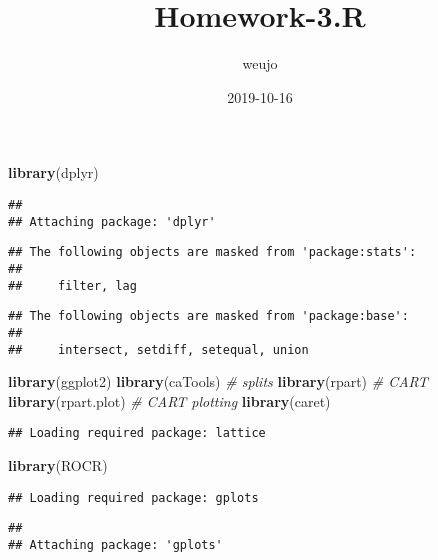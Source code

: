 \documentclass[]{article}
\title{Homework-3.R}
\author{weujo}
\date{2019-10-16}
\newenvironment{Shaded}{\begin{snugshade}}{\end{snugshade}}
\newcommand{\CommentTok}[1]{\textcolor[rgb]{0.56,0.35,0.01}{\textit{#1}}}
\newcommand{\KeywordTok}[1]{\textcolor[rgb]{0.13,0.29,0.53}{\textbf{#1}}}
\newcommand{\NormalTok}[1]{#1}
\begin{document}
\maketitle

\begin{Shaded}
\begin{Highlighting}[]
\KeywordTok{library}\NormalTok{(dplyr)}
\end{Highlighting}
\end{Shaded}

\begin{verbatim}
## 
## Attaching package: 'dplyr'
\end{verbatim}

\begin{verbatim}
## The following objects are masked from 'package:stats':
## 
##     filter, lag
\end{verbatim}

\begin{verbatim}
## The following objects are masked from 'package:base':
## 
##     intersect, setdiff, setequal, union
\end{verbatim}

\begin{Shaded}
\begin{Highlighting}[]
\KeywordTok{library}\NormalTok{(ggplot2)}
\KeywordTok{library}\NormalTok{(caTools) }\CommentTok{# splits}
\KeywordTok{library}\NormalTok{(rpart) }\CommentTok{# CART}
\KeywordTok{library}\NormalTok{(rpart.plot) }\CommentTok{# CART plotting}
\KeywordTok{library}\NormalTok{(caret)}
\end{Highlighting}
\end{Shaded}

\begin{verbatim}
## Loading required package: lattice
\end{verbatim}

\begin{Shaded}
\begin{Highlighting}[]
\KeywordTok{library}\NormalTok{(ROCR)}
\end{Highlighting}
\end{Shaded}

\begin{verbatim}
## Loading required package: gplots
\end{verbatim}

\begin{verbatim}
## 
## Attaching package: 'gplots'
\end{verbatim}
\end{document}
